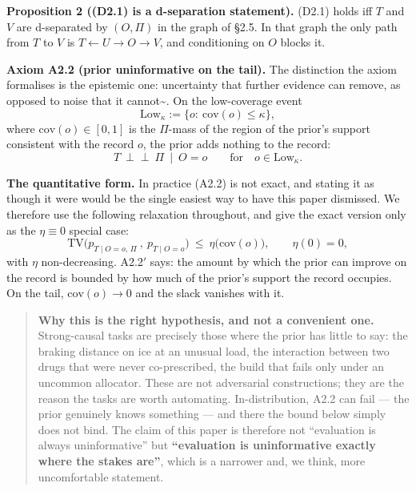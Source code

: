 \documentclass[11pt,a4paper]{article}
\begin{document}
\textbf{Proposition 2 ((D2.1) is a d-separation statement).} (D2.1) holds iff \(T\) and
\(V\) are d-separated by \((O,\Pi)\) in the graph of §2.5. In that graph the only
path from \(T\) to \(V\) is \(T\leftarrow U\to O\to V\), and conditioning on \(O\) blocks
it.

\textbf{Axiom A2.2 (prior uninformative on the tail).} The distinction the axiom
formalises is the epistemic one: uncertainty that further evidence can remove,
as opposed to noise that it cannot\textasciitilde{}\cite{hullermeier2021aleatoric}. On the
low-coverage event
\[
\mathrm{Low}_\kappa:=\big\{o:\ \mathrm{cov}(o)\le\kappa\big\},
\]
where \(\mathrm{cov}(o)\in[0,1]\) is the \(\Pi\)-mass of the region of the prior's
support consistent with the record \(o\), the prior adds nothing to the record:
\begin{equation}
T\ \perp\!\!\!\perp\ \Pi\ \mid\ O=o
\qquad\text{for}\quad o\in\mathrm{Low}_\kappa .
\tag{A2.2}
\end{equation}

\textbf{The quantitative form.} In practice (A2.2) is not exact, and stating it as
though it were would be the single easiest way to have this paper dismissed. We
therefore use the following relaxation throughout, and give the exact version only
as the \(\eta\equiv0\) special case:
\begin{equation}
\mathrm{TV}\Big(p_{T\mid O=o,\,\Pi}\ ,\ p_{T\mid O=o}\Big)\ \le\ \eta\big(\mathrm{cov}(o)\big),
\qquad \eta(0)=0,
\tag{A2.2'}
\end{equation}
with \(\eta\) non-decreasing. A2.2\('\) says: the amount by which the prior can improve
on the record is bounded by how much of the prior's support the record occupies.
On the tail, \(\mathrm{cov}(o)\to0\) and the slack vanishes with it.

\begin{quote}
\textbf{Why this is the right hypothesis, and not a convenient one.} Strong-causal
tasks are precisely those where the prior has little to say: the braking
distance on ice at an unusual load, the interaction between two drugs that were
never co-prescribed, the build that fails only under an uncommon allocator.
These are not adversarial constructions; they are the reason the tasks are
worth automating. In-distribution, A2.2 can fail --- the prior genuinely knows
something --- and there the bound below simply does not bind. The claim of this
paper is therefore not ``evaluation is always uninformative'' but \textbf{``evaluation is
uninformative exactly where the stakes are''}, which is a narrower and, we
think, more uncomfortable statement.
\end{quote}
\end{document}
